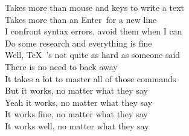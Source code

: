 Takes more than mouse and keys to write a text \\
Takes more than an \glqq Enter\grqq \ for a new line \\
I confront syntax errors, avoid them when I can \\
Do some research and everything is fine \\

 Well, \TeX \ 's not quite as hard as someone said \\
 There is no need to back away \\
 It takes a lot to master all of those commands \\
But it works, no matter what they say \\
Yeah it works, no matter what they say \\
It works fine, no matter what they say \\
It works well, no matter what they say \\


  
\pagebreak
